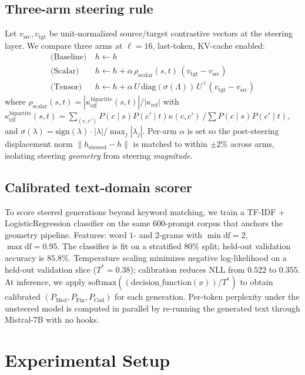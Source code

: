 \documentclass[10pt,twocolumn]{article}
\begin{document}
\subsection{Three-arm steering rule}
\label{sec:method-steer}

Let $v_{\text{src}},v_{\text{tgt}}$ be unit-normalized source/target contrastive vectors at the steering layer. We compare three arms at $\ell{=}16$, last-token, KV-cache enabled:
\begin{align}
\text{(Baseline)}\ & h\!\leftarrow\!h \\
\text{(Scalar)}\ & h\!\leftarrow\!h+\alpha\,\rho_{\text{scalar}}(s,t)\,(v_{\text{tgt}}{-}v_{\text{src}}) \\
\text{(Tensor)}\ & h\!\leftarrow\!h+\alpha\,U\,\mathrm{diag}(\sigma(\Lambda))\,U^{\!\top}(v_{\text{tgt}}{-}v_{\text{src}})
\end{align}
where $\rho_{\text{scalar}}(s,t){=}|\kappa^{\text{bipartite}}_{\text{eff}}(s,t)|/|\kappa_{\text{ref}}|$ with $\kappa^{\text{bipartite}}_{\text{eff}}(s,t){=}\sum_{(c,c')}P(c{\mid}s)P(c'{\mid}t)\kappa(c,c')\,/\!\sum P(c{\mid}s)P(c'{\mid}t)$, and $\sigma(\lambda){=}\mathrm{sign}(\lambda){\cdot}|\lambda|/\max_j|\lambda_j|$. Per-arm $\alpha$ is set so the post-steering displacement norm $\|h_{\text{steered}}{-}h\|$ is matched to within $\pm 2\%$ across arms, isolating steering \emph{geometry} from steering \emph{magnitude}.

\subsection{Calibrated text-domain scorer}
\label{sec:method-scorer}

To score steered generations beyond keyword matching, we train a TF-IDF + LogisticRegression classifier on the same $600$-prompt corpus that anchors the geometry pipeline. Features: word $1$- and $2$-grams with $\min\!\text{df}{=}2$, $\max\!\text{df}{=}0.95$. The classifier is fit on a stratified $80\%$ split; held-out validation accuracy is $85.8\%$. Temperature scaling minimizes negative log-likelihood on a held-out validation slice ($T^*{=}0.38$); calibration reduces NLL from $0.522$ to $0.355$. At inference, we apply $\text{softmax}((\text{decision\_function}(x))/T^*)$ to obtain calibrated $(P_{\text{Med}},P_{\text{Fin}},P_{\text{Cod}})$ for each generation. Per-token perplexity under the unsteered model is computed in parallel by re-running the generated text through Mistral-7B with no hooks.

\section{Experimental Setup}
\label{sec:setup}
\end{document}
